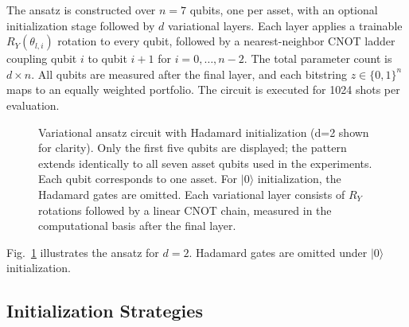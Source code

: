 \documentclass[runningheads]{llncs}
\begin{document}
The ansatz is constructed over $n = 7$ qubits, one per asset, with an optional initialization stage followed by $d$ variational layers. Each layer applies a trainable $R_Y(\theta_{l,i})$ rotation to every qubit, followed by a nearest-neighbor CNOT ladder coupling qubit $i$ to qubit $i+1$ for $i = 0,\ldots,n-2$. The total parameter count is $d \times n$. All qubits are measured after the final layer, and each bitstring $z \in \{0,1\}^n$ maps to an equally weighted portfolio. The circuit is executed for 1024 shots per evaluation.

\begin{figure}[t]
\centering
{}
\caption{Variational ansatz circuit with Hadamard initialization (d=2 shown for clarity). Only the first five qubits are displayed; the pattern extends identically to all seven asset qubits used in the experiments. Each qubit 
corresponds to one asset. For $|0\rangle$ initialization, 
the Hadamard gates are omitted. Each variational layer 
consists of $R_Y$ rotations followed by a linear CNOT 
chain, measured in the computational basis 
after the final layer.}
\label{fig:circuit}
\end{figure}

Fig.~\ref{fig:circuit} illustrates the ansatz for \(d=2\). Hadamard gates are omitted under \(|0\rangle\) initialization.

\subsection{Initialization Strategies}
\end{document}
